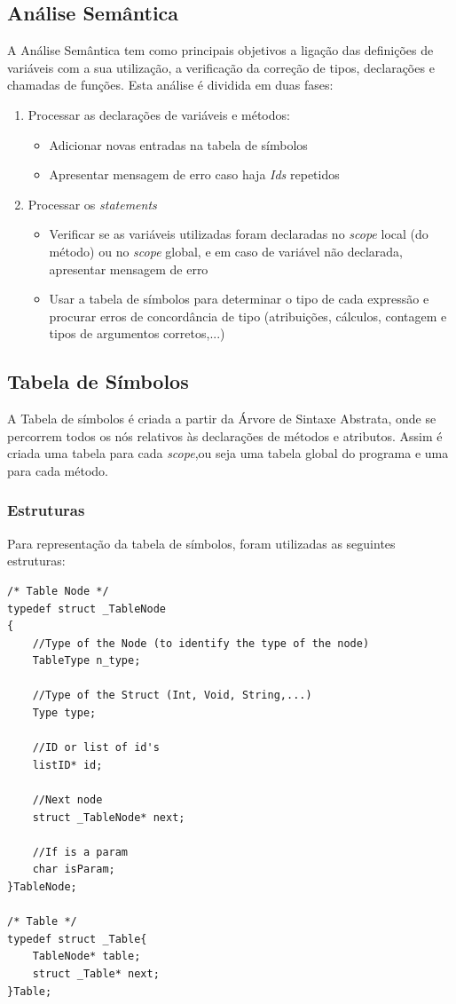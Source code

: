 \documentclass[12pt]{article}
\begin{document}
\subsection{Análise Semântica}
A Análise Semântica tem como principais objetivos a ligação das definições de variáveis com a sua utilização, a verificação da correção de tipos, declarações e chamadas de funções.
Esta análise é dividida em duas fases:
	\begin{enumerate}
		\item Processar as declarações de variáveis e métodos:
		\begin{itemize}
			\item Adicionar novas entradas na tabela de símbolos
			\item Apresentar mensagem de erro caso haja \emph{Ids} repetidos
		\end{itemize}
		\item Processar os \emph{statements}
		\begin{itemize}
			\item Verificar se as variáveis utilizadas foram declaradas no  \emph{scope} local (do método) ou no \emph{scope} global, e em caso de variável não declarada, apresentar mensagem de erro
			\item Usar a tabela de símbolos para determinar o tipo de cada expressão e procurar erros de concordância de tipo (atribuições, cálculos, contagem e tipos de argumentos corretos,...)
		\end{itemize}
	\end{enumerate}

\subsection{Tabela de Símbolos}

A Tabela de símbolos é criada a partir da Árvore de Sintaxe Abstrata, onde se percorrem todos os nós relativos às declarações de métodos e atributos. Assim é criada uma tabela para cada \emph{scope},ou seja uma tabela global do programa e uma para cada método.
 
\subsubsection{Estruturas}
Para representação da tabela de símbolos, foram utilizadas as seguintes estruturas:
\begin{lstlisting}
/* Table Node */
typedef struct _TableNode
{
    //Type of the Node (to identify the type of the node)
    TableType n_type;
    
    //Type of the Struct (Int, Void, String,...)
    Type type;
    
    //ID or list of id's
    listID* id;
    
    //Next node
    struct _TableNode* next;
    
    //If is a param
    char isParam;
}TableNode;

/* Table */
typedef struct _Table{
    TableNode* table;
    struct _Table* next;
}Table;

\end{lstlisting}
\end{document}
